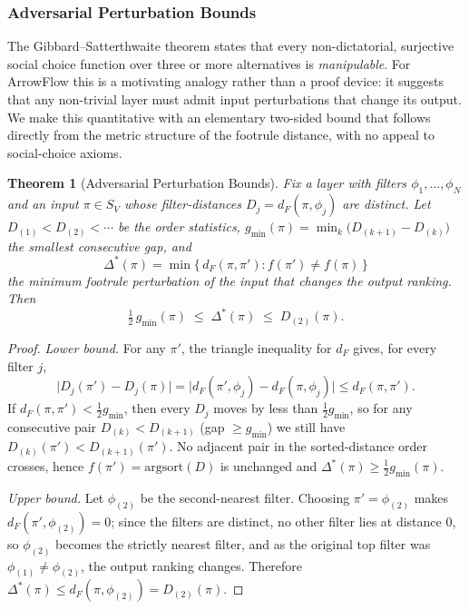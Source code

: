 \documentclass[12pt]{article}
\newcommand{\argsort}{\mathrm{argsort}}
\newtheorem{theorem}{Theorem}
\begin{document}
\subsubsection{Adversarial Perturbation Bounds}

The Gibbard--Satterthwaite theorem \citep{gibbard1973manipulation,satterthwaite1975strategy} states that every non-dictatorial, surjective social choice function over three or more alternatives is \emph{manipulable}.  For ArrowFlow this is a motivating analogy rather than a proof device: it suggests that any non-trivial layer must admit input perturbations that change its output.  We make this quantitative with an elementary two-sided bound that follows directly from the metric structure of the footrule distance, with no appeal to social-choice axioms.

\begin{theorem}[Adversarial Perturbation Bounds]
\label{thm:manipulability}
Fix a layer with filters $\phi_1, \dots, \phi_N$ and an input $\pi \in S_V$ whose filter-distances $D_j = d_F(\pi, \phi_j)$ are distinct.  Let $D_{(1)} < D_{(2)} < \cdots$ be the order statistics, $g_{\min}(\pi) = \min_k\bigl(D_{(k+1)} - D_{(k)}\bigr)$ the smallest consecutive gap, and
\[
\Delta^*(\pi) = \min\{\, d_F(\pi, \pi') : f(\pi') \neq f(\pi)\,\}
\]
the minimum footrule perturbation of the input that changes the output ranking.  Then
\[
\tfrac12\,g_{\min}(\pi) \;\le\; \Delta^*(\pi) \;\le\; D_{(2)}(\pi).
\]
\end{theorem}

\begin{proof}
\textit{Lower bound.}  For any $\pi'$, the triangle inequality for $d_F$ gives, for every filter $j$,
\[
\bigl|D_j(\pi') - D_j(\pi)\bigr| = \bigl|d_F(\pi', \phi_j) - d_F(\pi, \phi_j)\bigr| \le d_F(\pi, \pi').
\]
If $d_F(\pi, \pi') < \tfrac12 g_{\min}$, then every $D_j$ moves by less than $\tfrac12 g_{\min}$, so for any consecutive pair $D_{(k)} < D_{(k+1)}$ (gap $\ge g_{\min}$) we still have $D_{(k)}(\pi') < D_{(k+1)}(\pi')$.  No adjacent pair in the sorted-distance order crosses, hence $f(\pi') = \argsort(D) $ is unchanged and $\Delta^*(\pi) \ge \tfrac12 g_{\min}(\pi)$.

\textit{Upper bound.}  Let $\phi_{(2)}$ be the second-nearest filter.  Choosing $\pi' = \phi_{(2)}$ makes $d_F(\pi', \phi_{(2)}) = 0$; since the filters are distinct, no other filter lies at distance $0$, so $\phi_{(2)}$ becomes the strictly nearest filter, and as the original top filter was $\phi_{(1)} \neq \phi_{(2)}$, the output ranking changes.  Therefore $\Delta^*(\pi) \le d_F(\pi, \phi_{(2)}) = D_{(2)}(\pi)$.
\end{proof}
\end{document}
